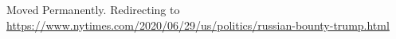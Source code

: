 Moved Permanently. Redirecting to
\url{https://www.nytimes.com/2020/06/29/us/politics/russian-bounty-trump.html}
